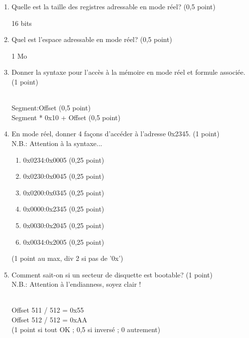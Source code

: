 \begin{enumerate}

\item Quelle est la taille des registres adressable en mode réel? (0,5 point)

\begin{correction}
16 bits
\end{correction}


\item Quel est l'espace adressable en mode réel? (0,5 point)

\begin{correction}
1 Mo
\end{correction}


\item Donner la syntaxe pour l'accès à la mémoire en mode réel et formule associée. (1 point)

\begin{correction}\\
Segment:Offset (0,5 point) \\
Segment * 0x10 + Offset (0,5 point)\\
\end{correction}

\item En mode réel, donner 4 façons d'accéder à l'adresse 0x2345. (1 point) \\
N.B.: Attention à la syntaxe...

\begin{correction}
\begin{enumerate}
\item 0x0234:0x0005 (0,25 point)
\item 0x0230:0x0045 (0,25 point)
\item 0x0200:0x0345 (0,25 point)
\item 0x0000:0x2345 (0,25 point)
\item 0x0030:0x2045 (0,25 point)
\item 0x0034:0x2005 (0,25 point)
\end{enumerate}
(1 point au max, div 2 si pas de '0x')\\
\end{correction}

\item Comment sait-on si un secteur de disquette est bootable? (1 point)\\
N.B.: Attention à l'endianness, soyez clair !

\begin{correction}\\
Offset 511 / 512 = 0x55\\
Offset 512 / 512 = 0xAA\\
(1 point si tout OK ; 0,5 si inversé ; 0 autrement)\\
\end{correction}



\end{enumerate}

